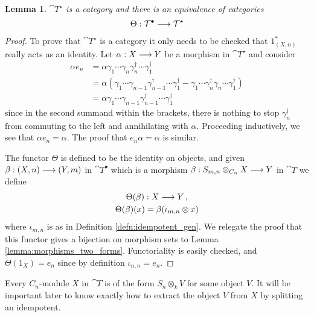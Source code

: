 \documentclass[english,letter paper,12pt,leqno]{article}
\newtheorem{lemma}[theorem]{Lemma}
\theoremstyle{example}
\numberwithin{equation}{section}
\def\ferm{\gamma}
\def\fermc{\gamma^\dagger}
\begin{document}
\begin{lemma}\label{lemma:equivcliffordthick} $\cat{T}^{\star}$ is a category and there is an equivalence of categories
\[
\Theta: \mathcal{T}^\bullet \longrightarrow \mathcal{T}^{\star}
\]
\end{lemma}
\begin{proof}
To prove that $\cat{T}^{\star}$ is a category it only needs to be checked that $1^*_{(X,n)}$ really acts as an identity. Let $\alpha: X \longrightarrow Y$ be a morphism in $\cat{T}^{\star}$ and consider
\begin{align*}
\alpha e_n &= \alpha \ferm_1 \cdots \ferm_n \fermc_n \cdots \fermc_1\\
&= \alpha \left( \ferm_1 \cdots \ferm_{n-1} \fermc_{n-1} \cdots \fermc_1 - \ferm_1 \cdots \fermc_n \ferm_n \cdots \fermc_1 \right)\\
&= \alpha \ferm_1 \cdots \ferm_{n-1} \fermc_{n-1} \cdots \fermc_1
\end{align*}
since in the second summand within the brackets, there is nothing to stop $\fermc_n$ from commuting to the left and annihilating with $\alpha$. Proceeding inductively, we see that $\alpha e_n = \alpha$. The proof that $e_n \alpha = \alpha$ is similar.

The functor $\Theta$ is defined to be the identity on objects, and given $\beta: (X,n) \longrightarrow (Y,m)$ in $\cat{T}^{\bullet}$ which is a morphism $\beta: S_{m,n} \otimes_{C_n} X \longrightarrow Y$ in $\cat{T}$ we define
\begin{gather*}
\Theta(\beta): X \longrightarrow Y\,,\\
\Theta(\beta)( x ) = \beta( \iota_{m,n} \otimes x )
\end{gather*}
where $\iota_{m,n}$ is as in Definition \ref{defn:idempotent_gen}. We relegate the proof that this functor gives a bijection on morphism sets to Lemma \ref{lemma:morphisms_two_forms}. Functoriality is easily checked, and $\Theta(1_X) = e_n$ since by definition $\iota_{n,n} = e_n$.
\end{proof}

Every $C_n$-module $X$ in $\cat{T}$ is of the form $S_n \otimes_k V$ for some object $V$. It will be important later to know exactly how to extract the object $V$ from $X$ by splitting an idempotent.
\end{document}
